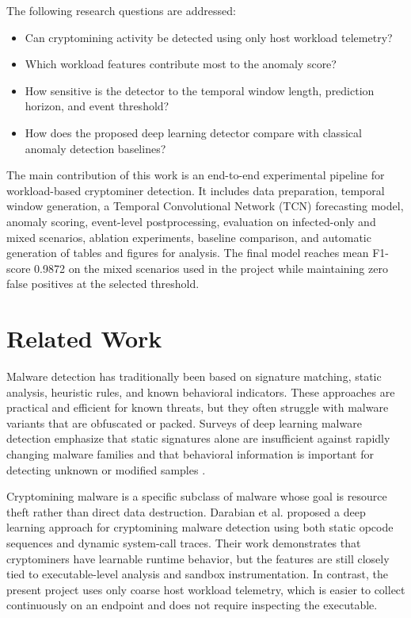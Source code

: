 \documentclass[a4paper,12pt]{extarticle}
\begin{document}
The following research questions are addressed:
\begin{itemize}
    \item Can cryptomining activity be detected using only host workload telemetry?
    \item Which workload features contribute most to the anomaly score?
    \item How sensitive is the detector to the temporal window length, prediction horizon, and event threshold?
    \item How does the proposed deep learning detector compare with classical anomaly detection baselines?
\end{itemize}

The main contribution of this work is an end-to-end experimental pipeline for workload-based cryptominer detection. It includes data preparation, temporal window generation, a Temporal Convolutional Network (TCN) forecasting model, anomaly scoring, event-level postprocessing, evaluation on infected-only and mixed scenarios, ablation experiments, baseline comparison, and automatic generation of tables and figures for analysis. The final model reaches mean F1-score 0.9872 on the mixed scenarios used in the project while maintaining zero false positives at the selected threshold.

\newpage
\section{Related Work}
\label{sec:related}

Malware detection has traditionally been based on signature matching, static analysis, heuristic rules, and known behavioral indicators. These approaches are practical and efficient for known threats, but they often struggle with malware variants that are obfuscated or packed. Surveys of deep learning malware detection emphasize that static signatures alone are insufficient against rapidly changing malware families and that behavioral information is important for detecting unknown or modified samples \cite{redhu2024deep}.

Cryptomining malware is a specific subclass of malware whose goal is resource theft rather than direct data destruction. Darabian et al. \cite{darabian2020cryptomining} proposed a deep learning approach for cryptomining malware detection using both static opcode sequences and dynamic system-call traces. Their work demonstrates that cryptominers have learnable runtime behavior, but the features are still closely tied to executable-level analysis and sandbox instrumentation. In contrast, the present project uses only coarse host workload telemetry, which is easier to collect continuously on an endpoint and does not require inspecting the executable.
\end{document}
